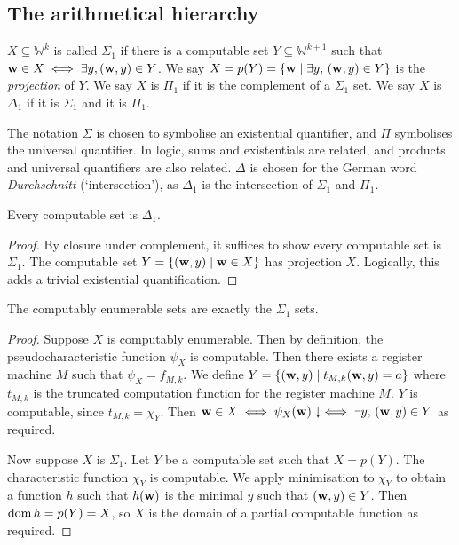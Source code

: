 \subsection{The arithmetical hierarchy}
\begin{definition}
	\( X \subseteq \mathbb W^k \) is called \( \Sigma_1 \) if there is a computable set \( Y \subseteq \mathbb W^{k+1} \) such that \( \vb w \in X \iff \exists y, (\vb w, y) \in Y \).
	We say \( X = p(Y) = \qty{\vb w \mid \exists y,\, (\vb w, y) \in Y} \) is the \emph{projection} of \( Y \).
	We say \( X \) is \( \Pi_1 \) if it is the complement of a \( \Sigma_1 \) set.
	We say \( X \) is \( \Delta_1 \) if it is \( \Sigma_1 \) and it is \( \Pi_1 \).
\end{definition}
\begin{remark}
	The notation \( \Sigma \) is chosen to symbolise an existential quantifier, and \( \Pi \) symbolises the universal quantifier.
	In logic, sums and existentials are related, and products and universal quantifiers are also related.
	\( \Delta \) is chosen for the German word \emph{Durchschnitt} (`intersection'), as \( \Delta_1 \) is the intersection of \( \Sigma_1 \) and \( \Pi_1 \).
\end{remark}
\begin{proposition}
	Every computable set is \( \Delta_1 \).
\end{proposition}
\begin{proof}
	By closure under complement, it suffices to show every computable set is \( \Sigma_1 \).
	The computable set \( Y = \qty{(\vb w, y) \mid \vb w \in X} \) has projection \( X \).
	Logically, this adds a trivial existential quantification.
\end{proof}
\begin{theorem}
	The computably enumerable sets are exactly the \( \Sigma_1 \) sets.
\end{theorem}
\begin{proof}
	Suppose \( X \) is computably enumerable.
	Then by definition, the pseudocharacteristic function \( \psi_X \) is computable.
	Then there exists a register machine \( M \) such that \( \psi_X = f_{M,k} \).
	We define \( Y = \qty{(\vb w, y) \mid t_{M,k}(\vb w, y) = a} \) where \( t_{M,k} \) is the truncated computation function for the register machine \( M \).
	\( Y \) is computable, since \( t_{M,k} = \chi_Y \).
	Then \( \vb w \in X \iff \psi_X(\vb w) \downarrow \iff \exists y,\, (\vb w, y) \in Y \) as required.

	Now suppose \( X \) is \( \Sigma_1 \).
	Let \( Y \) be a computable set such that \( X = p(Y) \).
	The characteristic function \( \chi_Y \) is computable.
	We apply minimisation to \( \chi_Y \) to obtain a function \( h \) such that \( h(\vb w) \) is the minimal \( y \) such that \( (\vb w, y) \in Y \).
	Then \( \operatorname{dom} h = p(Y) = X \), so \( X \) is the domain of a partial computable function as required.
\end{proof}

